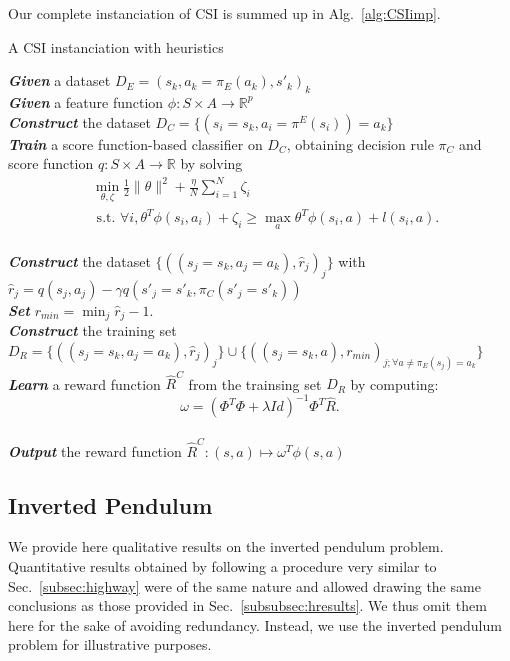 \documentclass[smallextended]{svjour3}
\begin{document}
Our complete instanciation of CSI is summed up in Alg.~\ref{alg:CSIimp}.
\begin{algorithm}%
  \caption{A CSI instanciation with heuristics}
  \label{alg:CSIimp}
  \emph{\textbf{Given}} a dataset  $D_E = (s_k,a_k=\pi_E(a_k),s'_k)_k$\;\\
  \emph{\textbf{Given}} a feature function $\phi: S\times A \rightarrow \mathbb{R}^p$\;\\
  \emph{\textbf{Construct}} the dataset $D_C=\{(s_i=s_k,a_i=\pi^E(s_i))=a_k\}$ \;\\
  \emph{\textbf{Train}} a score function-based classifier on $D_C$, obtaining decision rule $\pi_C$ and score function $q:S\times A \rightarrow \mathbb R$ by solving \begin{eqnarray*}
  &\min_{\theta,\zeta}\frac{1}{2}\|\theta\|^2 +
  \frac{\eta}{N}\sum_{i=1}^N \zeta_i \\
  &\text{~s.t.~} \forall i,
  \theta^T{\phi}(s_i,a_i)+\zeta_i \geq \max_a \theta^T
  {\phi}(s_i,a) + l(s_i,a). \label{eq:qp_taskar}
\end{eqnarray*}\;\\
\emph{\textbf{Construct}} the dataset $\{((s_{j}=s_k,a_{j}=a_k),\hat r_j)_j\}$ with $\hat r_j = q(s_j,a_j) - \gamma q(s'_j=s'_k,\pi_C(s'_j=s'_k))$\;\\
\emph{\textbf{Set}} $r_{min} = \min_j\hat r_j - 1.$\;\\
\emph{\textbf{Construct}} the training set  $D_R = \{((s_{j}=s_k,a_{j}=a_k),\hat r_j)_j\}\cup\{((s_j=s_k,a),r_{min})_{j;\forall a\neq \pi_E(s_j) = a_k}\}$ \;\\
\emph{\textbf{Learn}} a reward function $\hat R^C$ from the trainsing set $D_R$ by computing:
\begin{equation*}
  \omega = (\Phi^T\Phi + \lambda Id)^{-1}\Phi^T\hat R.
\end{equation*}\;\\
\emph{\textbf{Output}} the reward function $\hat R^{C}: (s,a) \mapsto \omega^T \phi(s,a)$ \;
\end{algorithm}

\subsection{Inverted Pendulum}
\label{subsec:IP}
We provide here qualitative results on the inverted pendulum problem. Quantitative results obtained by following a procedure very similar to Sec.~\ref{subsec:highway} were of the same nature and allowed drawing the same conclusions as those provided in Sec.~\ref{subsubsec:hresults}. We thus omit them here for the sake of avoiding redundancy. Instead, we use the inverted pendulum problem for illustrative purposes.
\end{document}
